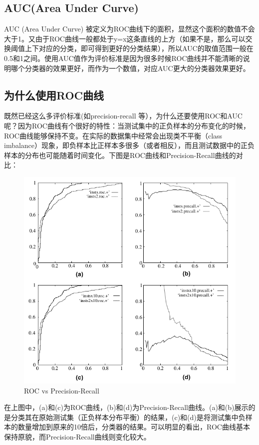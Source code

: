 \documentclass[12pt]{article}
\begin{document}
\subsection{AUC(Area Under Curve)}
AUC (Area Under Curve) 被定义为ROC曲线下的面积，显然这个面积的数值不会大于1。又由于ROC曲线一般都处于y=x这条直线的上方（如果不是，那么可以交换阈值上下对应的分类，即可得到更好的分类结果），所以AUC的取值范围一般在0.5和1之间。使用AUC值作为评价标准是因为很多时候ROC曲线并不能清晰的说明哪个分类器的效果更好，而作为一个数值，对应AUC更大的分类器效果更好。

\subsection{为什么使用ROC曲线}
既然已经这么多评价标准(如precision-recall 等），为什么还要使用ROC和AUC呢？因为ROC曲线有个很好的特性：当测试集中的正负样本的分布变化的时候，ROC曲线能够保持不变。在实际的数据集中经常会出现类不平衡（class imbalance）现象，即负样本比正样本多很多（或者相反），而且测试数据中的正负样本的分布也可能随着时间变化。下图是ROC曲线和Precision-Recall曲线的对比：

\begin{figure}[ht]
  \centering
  \includegraphics[width=.8\textwidth]{fig/ROC_vs_Precision_Recall.png} %
  \caption{ROC vs Precision-Recall} %
  \label{ROC_vs_Precision_Recall} %
\end{figure}

在上图中，(a)和(c)为ROC曲线，(b)和(d)为Precision-Recall曲线。(a)和(b)展示的是分类其在原始测试集（正负样本分布平衡）的结果，(c)和(d)是将测试集中负样本的数量增加到原来的10倍后，分类器的结果。可以明显的看出，ROC曲线基本保持原貌，而Precision-Recall曲线则变化较大。
\end{document}
